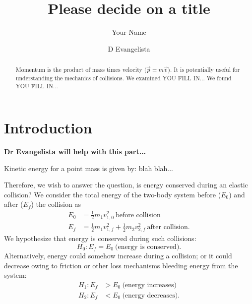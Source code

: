 \documentclass[aps,prl,reprint]{revtex4-1}
\begin{document}
\title{Please decide on a title}
\author{Your Name}
\author{D Evangelista}

\newcommand{\student}[1]{{{#1}}}

\begin{abstract}
Momentum is the product of mass times velocity ($\vec{p}=m\vec{v}$). It is potentially useful for understanding the mechanics of collisions. We examined \student{YOU FILL IN...}  We found \student{YOU FILL IN...}\end{abstract}
\maketitle

\section{Introduction}
\textbf{Dr Evangelista will help with this part...}

Kinetic energy for a point mass is given by:
blah blah...
%

Therefore, we wish to answer the question, is energy conserved during an elastic collision? We consider the total energy of the two-body system before ($E_0$) and after ($E_f$) the collision as
\begin{align}
E_0 &= \frac{1}{2} m_1 v_{1,0}^2\ \text{before collision}\\
E_f &= \frac{1}{2} m_1 v_{1,f}^2 + \frac{1}{2} m_2 v_{2,f}^2\ \text{after collision}.
\end{align}
We hypothesize that energy is conserved during such collisions:
\begin{equation}
H_0: E_f = E_0\ \text{(energy is conserved)}.
\end{equation}
Alternatively, energy could somehow increase during a collision; or it could decrease owing to friction or other loss mechanisms bleeding energy from the system: 
\begin{align}
H_1: E_f &> E_0\ \text{(energy increases)} \\
H_2: E_f &< E_0\ \text{(energy decreases)} .
\end{align}
\end{document}
